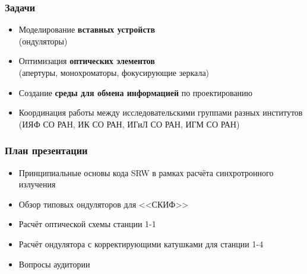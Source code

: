\documentclass[14pt, hyperref = {colorlinks}]{beamer}
\begin{document}
\small
\begin{frame}
\frametitle{Задачи}\label{t1}
\begin{center}
\begin{itemize}
	\item Моделирование \textbf{вставных устройств} \\(ондуляторы)
  	\item Оптимизация \textbf{оптических элементов} \\(апертуры, монохроматоры, фокусирующие зеркала)
  	\item Создание \textbf{среды для обмена информацией} по проектированию
	\item Координация работы между исследовательскими группами разных институтов (ИЯФ СО РАН, ИК СО РАН, ИГиЛ СО РАН, ИГМ СО РАН)
\end{itemize}
\end{center}
\end{frame}



\small
\begin{frame}
\frametitle{План презентации}\label{t1}
\begin{center}
		\begin{itemize}
		\item Принципиальные основы кода SRW в рамках расчёта синхротронного излучения
		\item Обзор типовых ондуляторов для <<СКИФ>>
		\item Расчёт оптической схемы станции 1-1
		\item Расчёт ондулятора с корректирующими катушками для станции 1-4 
		\item Вопросы аудитории
	\end{itemize}
\end{center}
\end{frame}
\end{document}

